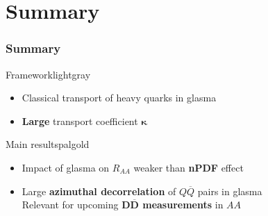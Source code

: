 \documentclass[aspectratio=169,11pt,usenames,dvipsnames]{beamer}
\begin{document}

\section{Summary}
\begin{frame}
    \frametitle{Summary}
    \begin{center}
        \begin{custombox2}{Framework}{lightgray}
            \small
            \begin{varwidth}{0.51\textwidth}
            \begin{itemize}\itemsep0em 
                \itemsep0em
                \item Classical transport of heavy quarks in glasma
                \item \textbf{Large} transport coefficient $\boldsymbol{\kappa}$
            \end{itemize}
            \end{varwidth}
        \end{custombox2}


        \begin{custombox2}{Main results}{palgold}
            \small
            \begin{varwidth}{0.61\textwidth}
            \begin{itemize}\itemsep0em 
                \itemsep0em
                \item Impact of glasma on $R_{AA}$ weaker than \textbf{\color{palgold}nPDF} effect
                \item Large \textbf{\color{palgold}azimuthal decorrelation} of $Q\overline{Q}$ pairs in glasma \\
                Relevant for upcoming \textbf{\color{palgold}$\boldsymbol{D\overline{D}}$ measurements} in $AA$
            \end{itemize}
            \end{varwidth}
        \end{custombox2}


\end{center}
\end{frame}
\end{document}
